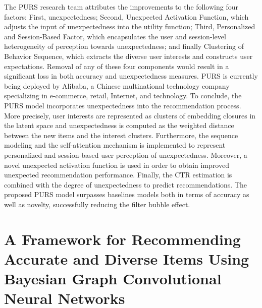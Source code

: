 The PURS research team attributes the improvements to the following four factors: First, unexpectedness; Second, Unexpected Activation Function, which adjusts the input of unexpectedness into the utility function; Third, Personalized and Session-Based Factor, which encapsulates the user and session-level heterogeneity of perception towards unexpectedness; and finally Clustering of Behavior Sequence, which extracts the diverse user interests and constructs user expectations. Removal of any of these four components would result in a significant loss in both accuracy and unexpectedness measures. PURS is currently being deployed by Alibaba, a Chinese multinational technology company specializing in e-commerce, retail, Internet, and technology.
To conclude, the PURS model incorporates unexpectedness into the recommendation process. More precisely, user interests are represented as clusters of embedding closures in the latent space and unexpectedness is computed as the weighted distance between the new items and the interest clusters. Furthermore, the sequence modeling and the self-attention mechanism is implemented to represent personalized and session-based user perception of unexpectedness. Moreover, a novel unexpected activation function  is used in order to obtain improved unexpected recommendation performance. Finally, the CTR estimation is combined with the degree of unexpectedness to predict recommendations. The proposed PURS model surpasses baselines models both in terms of accuracy as well as novelty, successfully reducing the filter bubble effect. 

\section{A Framework for Recommending Accurate and Diverse Items  Using Bayesian Graph Convolutional Neural Networks}

